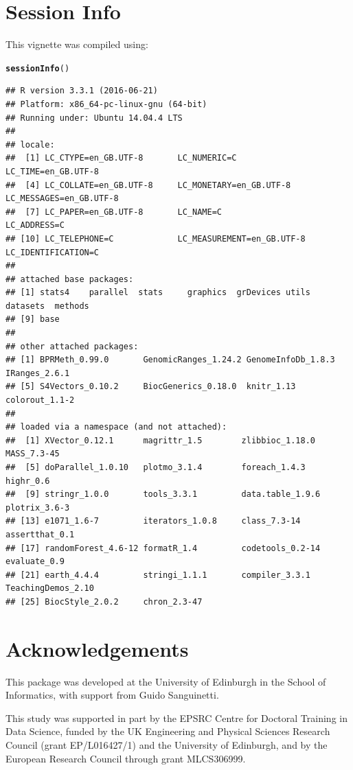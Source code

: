 \documentclass{article}\usepackage[]{graphicx}\usepackage[usenames,dvipsnames]{color}
\makeatletter
\newcommand{\hlstd}[1]{\textcolor[rgb]{0.345,0.345,0.345}{#1}}%
\newcommand{\hlkwd}[1]{\textcolor[rgb]{0.737,0.353,0.396}{\textbf{#1}}}%
\newenvironment{kframe}{%
 \def\at@end@of@kframe{}%
 \ifinner\ifhmode%
  \def\at@end@of@kframe{\end{minipage}}%
  \begin{minipage}{\columnwidth}%
 \fi\fi%
 \def\FrameCommand##1{\hskip\@totalleftmargin \hskip-\fboxsep
 \colorbox{shadecolor}{##1}\hskip-\fboxsep
     \hskip-\linewidth \hskip-\@totalleftmargin \hskip\columnwidth}%
 \MakeFramed {\advance\hsize-\width
   \@totalleftmargin\z@ \linewidth\hsize
   \@setminipage}}%
 {\par\unskip\endMakeFramed%
 \at@end@of@kframe}
\newenvironment{knitrout}{}{} %
\makeatother
\begin{document}
\section{Session Info}
This vignette was compiled using:
\begin{knitrout}
\color{fgcolor}\begin{kframe}
\begin{alltt}
\hlkwd{sessionInfo}\hlstd{()}
\end{alltt}
\begin{verbatim}
## R version 3.3.1 (2016-06-21)
## Platform: x86_64-pc-linux-gnu (64-bit)
## Running under: Ubuntu 14.04.4 LTS
## 
## locale:
##  [1] LC_CTYPE=en_GB.UTF-8       LC_NUMERIC=C               LC_TIME=en_GB.UTF-8       
##  [4] LC_COLLATE=en_GB.UTF-8     LC_MONETARY=en_GB.UTF-8    LC_MESSAGES=en_GB.UTF-8   
##  [7] LC_PAPER=en_GB.UTF-8       LC_NAME=C                  LC_ADDRESS=C              
## [10] LC_TELEPHONE=C             LC_MEASUREMENT=en_GB.UTF-8 LC_IDENTIFICATION=C       
## 
## attached base packages:
## [1] stats4    parallel  stats     graphics  grDevices utils     datasets  methods  
## [9] base     
## 
## other attached packages:
## [1] BPRMeth_0.99.0       GenomicRanges_1.24.2 GenomeInfoDb_1.8.3   IRanges_2.6.1       
## [5] S4Vectors_0.10.2     BiocGenerics_0.18.0  knitr_1.13           colorout_1.1-2      
## 
## loaded via a namespace (and not attached):
##  [1] XVector_0.12.1      magrittr_1.5        zlibbioc_1.18.0     MASS_7.3-45        
##  [5] doParallel_1.0.10   plotmo_3.1.4        foreach_1.4.3       highr_0.6          
##  [9] stringr_1.0.0       tools_3.3.1         data.table_1.9.6    plotrix_3.6-3      
## [13] e1071_1.6-7         iterators_1.0.8     class_7.3-14        assertthat_0.1     
## [17] randomForest_4.6-12 formatR_1.4         codetools_0.2-14    evaluate_0.9       
## [21] earth_4.4.4         stringi_1.1.1       compiler_3.3.1      TeachingDemos_2.10 
## [25] BiocStyle_2.0.2     chron_2.3-47
\end{verbatim}
\end{kframe}
\end{knitrout}

\section{Acknowledgements}
This package was developed at the University of Edinburgh in the School of Informatics, with support from Guido
Sanguinetti.

This study was supported in part by the EPSRC Centre for Doctoral Training in Data Science, funded by the UK Engineering and Physical Sciences Research Council (grant EP/L016427/1) and the University of Edinburgh, and by the European Research Council through grant MLCS306999.


\end{document}
